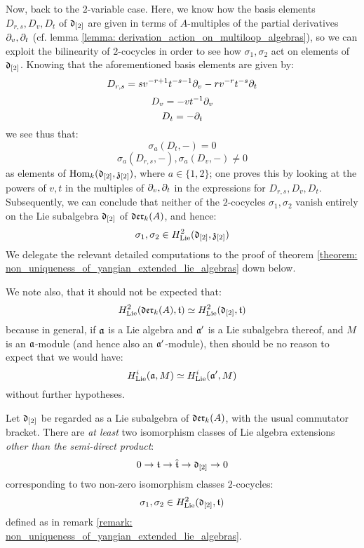 \begin{remark}
            Now, back to the $2$-variable case. Here, we know how the basis elements $D_{r, s}, D_v, D_t$ of $\mathfrak{d}_{[2]}$ are given in terms of $A$-multiples of the partial derivatives $\partial_v, \partial_t$ (cf. lemma \ref{lemma: derivation_action_on_multiloop_algebras}), so we can exploit the bilinearity of $2$-cocycles in order to see how $\sigma_1, \sigma_2$ act on elements of $\mathfrak{d}_{[2]}$. Knowing that the aforementioned basis elements are given by:
                $$D_{r, s} = s v^{-r + 1} t^{-s - 1} \partial_v - r v^{-r} t^{-s} \partial_t$$
                $$D_v = -v t^{-1} \partial_v$$
                $$D_t = -\partial_t$$
            we see thus that:
                $$\sigma_a(D_t, -) = 0$$
                $$\sigma_a(D_{r, s}, -), \sigma_a(D_v, -) \not = 0$$
            as elements of $\mathrm{Hom}_k(\mathfrak{d}_{[2]}, \mathfrak{z}_{[2]})$, where $a \in \{1, 2\}$; one proves this by looking at the powers of $v, t$ in the multiples of $\partial_v, \partial_t$ in the expressions for $D_{r, s}, D_v, D_t$. Subsequently, we can conclude that neither of the $2$-cocycles $\sigma_1, \sigma_2$ vanish entirely on the Lie subalgebra $\mathfrak{d}_{[2]}$ of $\mathfrak{der}_k(A)$, and hence:
                $$\sigma_1, \sigma_2 \in H^2_{\mathrm{Lie}}(\mathfrak{d}_{[2]}, \mathfrak{z}_{[2]})$$
            We delegate the relevant detailed computations to the proof of theorem \ref{theorem: non_uniqueness_of_yangian_extended_lie_algebras} down below.  

            We note also, that it should not be expected that:
                $$H^2_{\mathrm{Lie}}(\mathfrak{der}_k(A), \mathfrak{t}) \simeq H^2_{\mathrm{Lie}}(\mathfrak{d}_{[2]}, \mathfrak{t})$$
            because in general, if $\mathfrak{a}$ is a Lie algebra and $\mathfrak{a}'$ is a Lie subalgebra thereof, and $M$ is an $\mathfrak{a}$-module (and hence also an $\mathfrak{a}'$-module), then should be no reason to expect that we would have:
                $$H^i_{\mathrm{Lie}}(\mathfrak{a}, M) \simeq H^i_{\mathrm{Lie}}(\mathfrak{a}', M)$$
            without further hypotheses. 

        \end{remark}
        \begin{theorem} \label{theorem: non_uniqueness_of_yangian_extended_lie_algebras}
            Let $\mathfrak{d}_{[2]}$ be regarded as a Lie subalgebra of $\mathfrak{der}_k(A)$, with the usual commutator bracket. There are \textit{at least} two isomorphism classes of Lie algebra extensions \textit{other than the semi-direct product}:
                $$0 \to \mathfrak{t} \to \hat{\mathfrak{t}} \to \mathfrak{d}_{[2]} \to 0$$
            corresponding to two non-zero isomorphism classes $2$-cocycles:
                $$\sigma_1, \sigma_2 \in H^2_{\mathrm{Lie}}(\mathfrak{d}_{[2]}, \mathfrak{t})$$
            defined as in remark \ref{remark: non_uniqueness_of_yangian_extended_lie_algebras}.

        \end{theorem}
